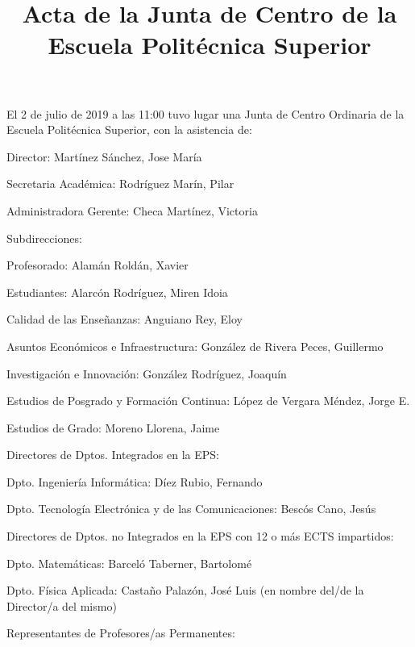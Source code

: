 \documentclass[numerado]{plantillasEPS} %
\title{Acta de la Junta de Centro de la Escuela Politécnica Superior} %
\begin{document}
El 2 de julio de 2019 a las 11:00 tuvo lugar una Junta de Centro Ordinaria de la Escuela Politécnica Superior, con la asistencia de: 

\begin{asisten}
    \item[Director:] Martínez Sánchez, Jose María
    \item[Secretaria Académica:] Rodríguez Marín, Pilar
    \item[Administradora Gerente:] Checa Martínez, Victoria
    
    \item[Subdirecciones:] 
    \begin{asisten}
        \item[Profesorado:] Alamán Roldán, Xavier
        \item[Estudiantes:] Alarcón Rodríguez, Miren Idoia
        \item[Calidad de las Enseñanzas:] Anguiano Rey, Eloy
        \item[Asuntos Económicos e Infraestructura:] González de Rivera Peces, Guillermo
        \item[Investigación e Innovación:] González Rodríguez, Joaquín
        \item[Estudios de Posgrado y Formación Continua:] López de Vergara Méndez, Jorge E.
        \item[Estudios de Grado:] Moreno Llorena, Jaime
    \end{asisten} 
    \item[Directores de Dptos. Integrados en la EPS:] 
    \begin{asisten}
        \item[Dpto. Ingeniería Informática:] Díez Rubio, Fernando
        \item[Dpto. Tecnología Electrónica y de las Comunicaciones:] Bescós Cano, Jesús
    \end{asisten} 
    \item[Directores de Dptos. no Integrados en la EPS con 12 o más ECTS impartidos:] 
    \begin{asisten}
        \item[Dpto. Matemáticas:] Barceló Taberner, Bartolomé
        \item[Dpto. Física Aplicada:] Castaño Palazón, José Luis (en nombre del/de la Director/a del mismo)
    \end{asisten} 
    \item[Representantes de Profesores/as Permanentes:] 

\end{asisten}
\end{document}
